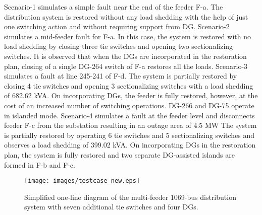 \documentclass[12pt]{article}
\begin{document}
Scenario-1 simulates a simple fault near the end of the feeder F-a. The distribution system is restored without any load shedding with the help of just one switching action and without requiring support from DG. 
Scenario-2 simulates a mid-feeder fault for F-a. In this case, the system is restored with no load shedding by closing three tie switches and opening two sectionalizing switches. It is observed that when the DGs are incorporated in the restoration plan, closing of a single DG-264 switch of F-a restores all the loads. %
Scenario-3 simulates a fault at line 245-241 of F-d. The system is partially restored by closing 4 tie switches and opening 3 sectionalizing switches with a load shedding of 682.62 kVA. %
On incorporating DGs, the feeder is fully restored, however, at the cost of an increased number of switching operations. %
DG-266 and DG-75 operate in islanded mode.  %
Scenario-4 simulates a fault at the feeder level and disconnects feeder F-c from the substation resulting in an outage area of 4.5 MW %
The system is partially restored by operating 6 tie switches and 5 sectionalizing switches and observes a load shedding of 399.02 kVA. %
On incorporating DGs in the restoration plan, the system is fully restored and two separate DG-assisted islands are formed in F-b and F-c. %

\begin{figure}[t]
    \centering
    \texttt{[image: images/testcase\_new.eps]}
        \vspace{-0.3 cm}
    \caption{Simplified one-line diagram of the multi-feeder 1069-bus distribution system with seven additional tie switches and four DGs.}
    \label{fig:ser}
    \vspace{-0.2cm}
\end{figure}
\end{document}
